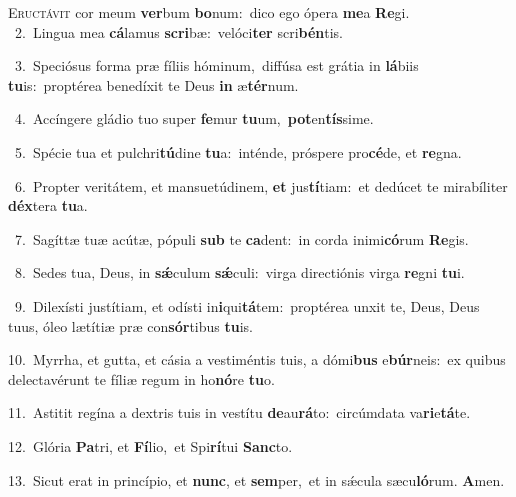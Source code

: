 \lettrine{\initial\textcolor{\initialcolor}{E}}{ructávit} cor meum \textbf{ver}\-bum \textbf{bo}\-num:~\star dico ego ópera \textbf{me}\-a \textbf{Re}\-gi.\\
{\numbfont\textcolor{\numbcolor}{~2.}}~Lingua mea \textbf{cá}\-lamus \textbf{scri}\-bæ:~\star velóci\textbf{ter} scri\-\textbf{bén}\-tis.\par
{\numbfont\textcolor{\numbcolor}{~3.}}~Speciósus forma præ fíliis hóminum,~\dagger diffúsa est grátia in \textbf{lá}\-biis \textbf{tu}\-is:~\star proptérea benedíxit te Deus \textbf{in} æ\-\textbf{tér}\-num.\par
{\numbfont\textcolor{\numbcolor}{~4.}}~Accíngere gládio tuo super \textbf{fe}\-mur \textbf{tu}\-um,~\star \textbf{pot}\-en\-\textbf{tís}\-sime.\par
{\numbfont\textcolor{\numbcolor}{~5.}}~Spécie tua et pulchri\-\textbf{tú}\-dine \textbf{tu}\-a:~\star inténde, próspere pro\-\textbf{cé}\-de, et \textbf{re}\-gna.\par
{\numbfont\textcolor{\numbcolor}{~6.}}~Propter veritátem, et mansuetúdinem, \textbf{et} jus\-\textbf{tí}\-tiam:~\star et dedúcet te mirabíliter \textbf{déx}\-tera \textbf{tu}\-a.\par
{\numbfont\textcolor{\numbcolor}{~7.}}~Sagíttæ tuæ acútæ, pópuli \textbf{sub} te \textbf{ca}\-dent:~\star in corda inimi\-\textbf{có}\-rum \textbf{Re}\-gis.\par
{\numbfont\textcolor{\numbcolor}{~8.}}~Sedes tua, Deus, in \textbf{sǽ}\-culum \textbf{sǽ}\-culi:~\star virga directiónis virga \textbf{re}\-gni \textbf{tu}\-i.\par
{\numbfont\textcolor{\numbcolor}{~9.}}~Dilexísti justítiam, et odísti in\-\textbf{i}\-qui\-\textbf{tá}\-tem:~\star proptérea unxit te, Deus, Deus tuus, óleo lætítiæ præ con\-\textbf{sór}\-tibus \textbf{tu}\-is.\par
{\numbfont\textcolor{\numbcolor}{10.}}~Myrrha, et gutta, et cásia a vestiméntis tuis, a dómi\textbf{bus} e\-\textbf{búr}\-neis:~\star ex quibus delectavérunt te fíliæ regum in ho\-\textbf{nó}\-re \textbf{tu}\-o.\par
{\numbfont\textcolor{\numbcolor}{11.}}~Astitit regína a dextris tuis in vestítu \textbf{de}\-au\-\textbf{rá}\-to:~\star circúmdata va\-\textbf{ri}\-e\-\textbf{tá}\-te.\par
{\numbfont\textcolor{\numbcolor}{12.}}~Glória \textbf{Pa}\-tri, et \textbf{Fí}\-lio,~\star et Spi\-\textbf{rí}\-tui \textbf{Sanc}\-to.\par
{\numbfont\textcolor{\numbcolor}{13.}}~Sicut erat in princípio, et \textbf{nunc}\-, et \textbf{sem}\-per,~\star et in sǽcula sæcu\-\textbf{ló}\-rum. \textbf{A}\-men.\par
